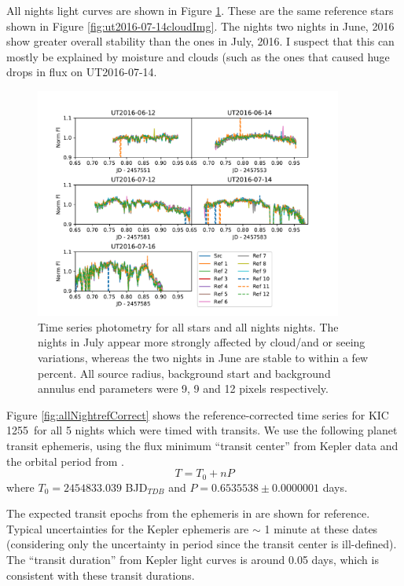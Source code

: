 \documentclass[preprint]{aastex61}
\newcommand{\shStar}{KIC 1255}
\begin{document}
All nights light curves are shown in Figure \ref{fig:allNightallStar}.
These are the same reference stars shown in Figure \ref{fig:ut2016-07-14cloudImg}.
The nights two nights in June, 2016 show greater overall stability than the ones in July, 2016.
I suspect that this can mostly be explained by moisture and clouds (such as the ones that caused huge drops in flux on UT2016-07-14.

\begin{figure}
\begin{centering}
\includegraphics[width=0.9\textwidth]{images/all_kic1255_phot/all_kic1255_allstar.pdf}
\caption{Time series photometry for all stars and all nights nights.
The nights in July appear more strongly affected by cloud/and or seeing variations, whereas the two nights in June are stable to within a few percent.
All source radius, background start and background annulus end parameters were 9, 9 and 12 pixels respectively.}\label{fig:allNightallStar}
\end{centering}
\end{figure}


Figure \ref{fig:allNightrefCorrect} shows the reference-corrected time series for \shStar\ for all 5 nights which were timed with transits.
We use the following planet transit ephemeris, using the flux minimum ``transit center'' from Kepler data \citep{schlawin2016kic1255} and the orbital period from \citet{vanWerkhoven2014}.
\begin{equation}
T = T_0 + n P
\end{equation}
where $T_0 = 2454833.039$ BJD$_{TDB}$ and $P = 0.653 553 8 \pm 0.000 000 1$ days.

The expected transit epochs from the ephemeris in \citep{vanWerkhoven2014} are shown for reference.
Typical uncertainties for the Kepler ephemeris are $\sim$ 1 minute at these dates (considering only the uncertainty in period since the transit center is ill-defined).
The ``transit duration'' from Kepler light curves is around 0.05 days, which is consistent with these transit durations.
\end{document}
